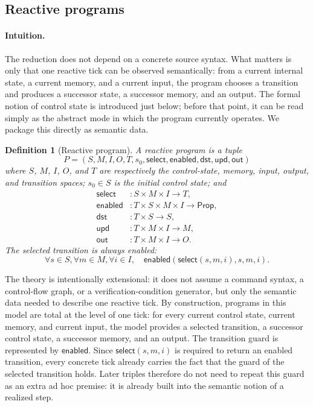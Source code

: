 \documentclass[acmsmall,screen]{acmart}
\theoremstyle{leftplain}
\theoremstyle{leftdefinition}
\newtheorem{definition}[theorem]{Definition}
\theoremstyle{leftremark}
\begin{document}
\subsection{Reactive programs}
\paragraph{Intuition.}
The reduction does not depend on a concrete source syntax. What matters is only
that one reactive tick can be observed semantically: from a current internal
state, a current memory, and a current input, the program chooses a transition
and produces a successor state, a successor memory, and an output. The formal
notion of control state is introduced just below; before that point, it can be
read simply as the abstract mode in which the program currently operates. We
package this directly as semantic data.

\begin{definition}[Reactive program]
A reactive program is a tuple
\[
  P = (S,M,I,O,T,s_0,\mathsf{select},\mathsf{enabled},\mathsf{dst},\mathsf{upd},\mathsf{out})
\]
where $S$, $M$, $I$, $O$, and $T$ are respectively the control-state,
memory, input, output, and transition spaces; $s_0 \in S$ is the initial
control state; and
\begin{align*}
  \mathsf{select} &: S \times M \times I \to T,\\
  \mathsf{enabled} &: T \times S \times M \times I \to \mathsf{Prop},\\
  \mathsf{dst} &: T \times S \to S,\\
  \mathsf{upd} &: T \times M \times I \to M,\\
  \mathsf{out} &: T \times M \times I \to O.
\end{align*}
The selected transition is always enabled:
\[
  \forall s \in S,\forall m \in M,\forall i \in I,\quad
  \mathsf{enabled}(\mathsf{select}(s,m,i),s,m,i).
\]
\end{definition}

The theory is intentionally extensional: it does not assume a command syntax,
a control-flow graph, or a verification-condition generator, but only the
semantic data needed to describe one reactive tick. By construction, programs
in this model are total at the level of one tick: for every current control
state, current memory, and current input, the model provides a selected
transition, a successor control state, a successor memory, and an output.
The transition guard is represented by $\mathsf{enabled}$. Since
$\mathsf{select}(s,m,i)$ is required to return an enabled transition, every
concrete tick already carries the fact that the guard of the selected
transition holds. Later triples therefore do not need to repeat this guard as
an extra ad hoc premise: it is already built into the semantic notion of a
realized step.
\end{document}
